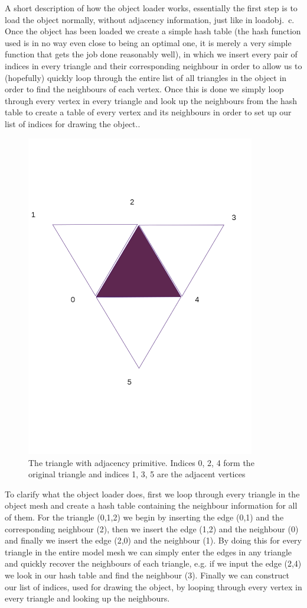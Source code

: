 \documentclass[a4paper, 12pt]{article}
\begin{document}
A short description of how the object loader works, essentially the first step
is to load the object normally, without adjacency information, just like in
loadobj.~c. Once the object has been loaded we create a simple hash table (the
hash function used is in no way even close to being an optimal one, it is merely
a very simple function that gets the job done reasonably well), in which we
insert every pair of indices in every triangle and their corresponding neighbour
in order to allow us to (hopefully) quickly loop through the entire list of all
triangles in the object in order to find the neighbours of each vertex. Once
this is done we simply loop through every vertex in every triangle and look up
the neighbours from the hash table to create a table of every vertex and its
neighbours in order to set up our list of indices for drawing the object..

\begin{figure}[h]
\centering
\includegraphics[width=10cm, trim = 0mm 50mm 0mm 50mm, clip]{triangle_adj.png}
\caption{The triangle with adjacency primitive. Indices 0, 2, 4 form the
original triangle and indices 1, 3, 5 are the adjacent vertices}
\end{figure}

To clarify what the object loader does, first we loop through every triangle in
the object mesh and create a hash table containing the neighbour information for
all of them. For the triangle (0,1,2) we begin by inserting the edge (0,1) and
the corresponding neighbour (2), then we insert the edge (1,2) and the
neighbour (0) and finally we insert the edge (2,0) and the neighbour (1). By
doing this for every triangle in the entire model mesh we can simply enter the
edges in any triangle and quickly recover the neighbours of each triangle, e.g.
if we input the edge (2,4) we look in our hash table and find the neighbour
(3). Finally we can construct our list of indices, used for drawing the object,
by looping through every vertex in every triangle and looking up the neighbours.
\end{document}
